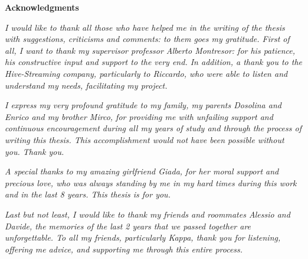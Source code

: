 \thispagestyle{empty}

\begin{center}
  {\bf \Huge Acknowledgments}
\end{center}

\vspace{4cm}


\emph{
  	I would like to thank all those who have helped me in the writing of the thesis with suggestions, criticisms and comments: to them goes my gratitude.
	First of all, I want to thank my supervisor professor Alberto Montresor: for his patience, his constructive input and support to the very end.
	In addition, a thank you to the Hive-Streaming company, particularly to Riccardo, who were able to listen and understand my needs, facilitating my project.
}

\emph{
	I express my very profound gratitude to my family, my parents Dosolina and Enrico and my brother Mirco, for providing me with unfailing support and continuous encouragement during all my years of study and through the process of writing this thesis. This accomplishment would not have been possible without you. Thank you.
}

\emph{
	A special thanks to my amazing girlfriend Giada, for her moral support and precious love, who was always standing by me in my hard times during this work and in the last 8 years. This thesis is for you.
}

\emph{
	Last but not least, I would like to thank my friends and roommates Alessio and Davide, the memories of the last 2 years that we passed together are unforgettable. To all my friends, particularly Kappa, thank you for listening, offering me advice, and supporting me through this entire process.
}